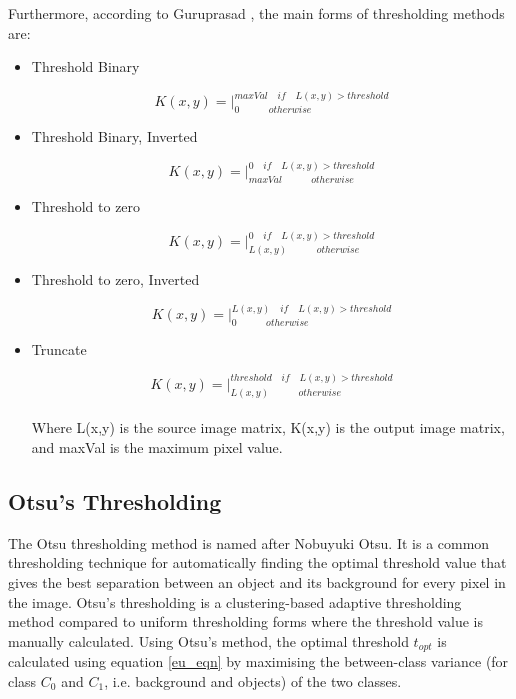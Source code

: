 Furthermore, according to Guruprasad \cite{guruprasad2020overview}, the main forms of thresholding methods are:
\begin{itemize}
    \item Threshold Binary
    
    \[
    K(x,y) = \Bigg|_{0 \qquad\quad otherwise}^{maxVal \quad if \quad L(x,y) > threshold}
    \]
    
    \item Threshold Binary, Inverted
    
    \[
    K(x,y) = \Bigg|_{maxVal \qquad\quad otherwise}^{0 \quad if \quad L(x,y) > threshold}
    \]
    
    \item Threshold to zero
    
    \[
    K(x,y) = \Bigg|_{L(x,y) \qquad\quad otherwise}^{0 \quad if \quad L(x,y) > threshold}
    \]
    
    \item Threshold to zero, Inverted
    
    \[
    K(x,y) = \Bigg|_{0 \qquad\quad otherwise}^{L(x,y) \quad if \quad L(x,y) > threshold}
    \]
    
    \item Truncate
    
    \[
    K(x,y) = \Bigg|_{L(x,y) \qquad\quad otherwise}^{threshold \quad if \quad L(x,y) > threshold}
    \]\\
    Where L(x,y) is the source image matrix, K(x,y) is the output image matrix, and maxVal is the maximum pixel value.
\end{itemize}


\subsection{Otsu’s Thresholding}

The Otsu thresholding method \cite{otsu1979threshold} is named after Nobuyuki Otsu. It is a common thresholding technique for automatically finding the optimal threshold value that gives the best separation between an object and its background for every pixel in the image. Otsu’s thresholding is a clustering-based adaptive thresholding method compared to uniform thresholding forms where the threshold value is manually calculated.
Using Otsu’s method, the optimal threshold $t_{opt}$ is calculated using equation \ref{eu_eqn} by maximising the between-class variance (for class $C_0$ and $C_1$, i.e. background and objects) of the two classes.

